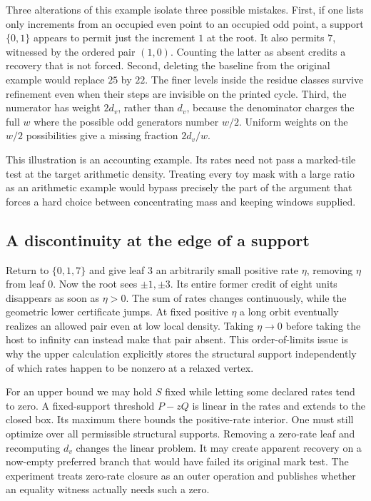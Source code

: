 Three alterations of this example isolate three possible mistakes. First, if one lists only increments from an occupied even point to an occupied odd point, a support \(\{0,1\}\) appears to permit just the increment \(1\) at the root. It also permits \(7\), witnessed by the ordered pair \((1,0)\). Counting the latter as absent credits a recovery that is not forced. Second, deleting the baseline from the original example would replace \(25\) by \(22\). The finer levels inside the residue classes survive refinement even when their steps are invisible on the printed cycle. Third, the numerator has weight \(2d_v\), rather than \(d_v\), because the denominator charges the full \(w\) where the possible odd generators number \(w/2\). Uniform weights on the \(w/2\) possibilities give a missing fraction \(2d_v/w\).

This illustration is an accounting example. Its rates need not pass a marked-tile test at the target arithmetic density. Treating every toy mask with a large ratio as an arithmetic example would bypass precisely the part of the argument that forces a hard choice between concentrating mass and keeping windows supplied.

\subsection{A discontinuity at the edge of a support}
Return to \(\{0,1,7\}\) and give leaf 3 an arbitrarily small positive rate \(\eta\), removing \(\eta\) from leaf 0. Now the root sees \(\pm1,\pm3\). Its entire former credit of eight units disappears as soon as \(\eta>0\). The sum of rates changes continuously, while the geometric lower certificate jumps. At fixed positive \(\eta\) a long orbit eventually realizes an allowed pair even at low local density. Taking \(\eta\to0\) before taking the host to infinity can instead make that pair absent. This order-of-limits issue is why the upper calculation explicitly stores the structural support independently of which rates happen to be nonzero at a relaxed vertex.

For an upper bound we may hold \(S\) fixed while letting some declared rates tend to zero. A fixed-support threshold \(P-zQ\) is linear in the rates and extends to the closed box. Its maximum there bounds the positive-rate interior. One must still optimize over all permissible structural supports. Removing a zero-rate leaf and recomputing \(d_v\) changes the linear problem. It may create apparent recovery on a now-empty preferred branch that would have failed its original mark test. The experiment treats zero-rate closure as an outer operation and publishes whether an equality witness actually needs such a zero.

